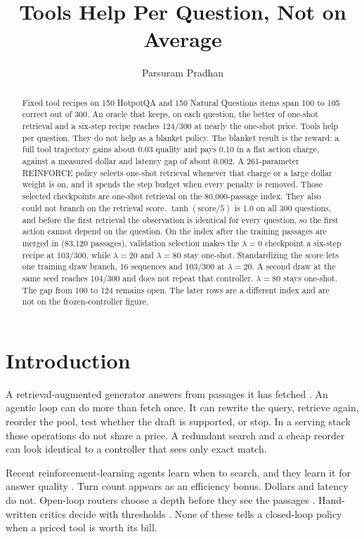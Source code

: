 \documentclass[letterpaper]{article} %
\title{Tools Help Per Question, Not on Average}
\author{Parsuram Pradhan}
\begin{document}
\maketitle

\begin{abstract}
Fixed tool recipes on 150 HotpotQA and 150 Natural Questions items span 100 to 105 correct out of 300. An oracle that keeps, on each question, the better of one-shot retrieval and a six-step recipe reaches 124/300 at nearly the one-shot price. Tools help per question. They do not help as a blanket policy. The blanket result is the reward: a full tool trajectory gains about 0.03 quality and pays 0.10 in a flat action charge, against a measured dollar and latency gap of about 0.002. A 261-parameter REINFORCE policy selects one-shot retrieval whenever that charge or a large dollar weight is on, and it spends the step budget when every penalty is removed. Those selected checkpoints are one-shot retrieval on the 80{,}000-passage index. They also could not branch on the retrieval score. \(\tanh(\mathrm{score}/5)\) is 1.0 on all 300 questions, and before the first retrieval the observation is identical for every question, so the first action cannot depend on the question. On the index after the training passages are merged in (83{,}120 passages), validation selection makes the \(\lambda{=}0\) checkpoint a six-step recipe at 103/300, while \(\lambda{=}20\) and \(\lambda{=}80\) stay one-shot. Standardizing the score lets one training draw branch, 16 sequences and 103/300 at \(\lambda{=}20\). A second draw at the same seed reaches 104/300 and does not repeat that controller. \(\lambda{=}80\) stays one-shot. The gap from 100 to 124 remains open. The later rows are a different index and are not on the frozen-controller figure.
\end{abstract}

\section{Introduction}
A retrieval-augmented generator answers from passages it has fetched \cite{lewis2020rag}. An agentic loop can do more than fetch once. It can rewrite the query, retrieve again, reorder the pool, test whether the draft is supported, or stop. In a serving stack those operations do not share a price. A redundant search and a cheap reorder can look identical to a controller that sees only exact match.

Recent reinforcement-learning agents learn when to search, and they learn it for answer quality \cite{jin2025searchr1,gandhi2026grasp}. Turn count appears as an efficiency bonus. Dollars and latency do not. Open-loop routers choose a depth before they see the passages \cite{jeong2024adaptive}. Hand-written critics decide with thresholds \cite{asai2024selfrag,yan2024crag}. None of these tells a closed-loop policy when a priced tool is worth its bill.
\end{document}
